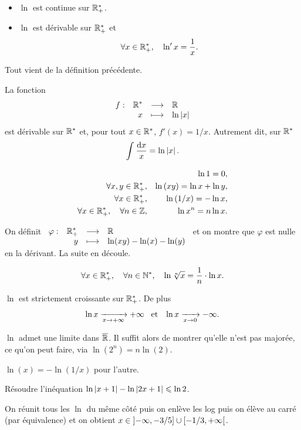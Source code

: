 \documentclass{magnoliaold}
\begin{document}
\begin{proposition}[utile=-3]
\begin{itemize}
\item $\ln$ est continue sur $\mathbb{R}_+^*$.
\item $\ln$ est dérivable sur $\mathbb{R}_+^*$ et
  \[\forall x\in\mathbb{R}_+^* ,\quad \ln' x=\frac{1}{x}.\]
\end{itemize}
\end{proposition}

\begin{preuve}
Tout vient de la définition précédente.
\end{preuve}

\begin{remarqueUnique}
\remarque La fonction
  \[\begin{array}[t]{lrcl} \displaystyle{f} : & \displaystyle{{\mathbb{R}^*}} & \longrightarrow & \displaystyle{\mathbb{R}} \\ & \displaystyle{x} & \longmapsto & \displaystyle{\ln\left|x\right|} \end{array}\]
  est dérivable sur ${\mathbb{R}^*}$ et, pour tout $x\in{\mathbb{R}^*}$, $f'(x)=1/x$. Autrement dit, sur ${\mathbb{R}^*}$
  \[\int_{}^{} \frac{\text{d}x}{x}=\ln\left|x\right|.\]
\end{remarqueUnique}

\begin{proposition}[utile=-3]
\begin{eqnarray*}
                   & & \ln 1=0,\\
\forall x,y\in\mathbb{R}_+^*, & & \ln\left(xy\right)=\ln x+\ln y,\\
\forall x\in\mathbb{R}_+^*, & & \ln\left(1/x\right)=-\ln x,\\
\forall x\in\mathbb{R}_+^* ,\quad \forall n\in\mathbb{Z}, & & \ln x^n=n\ln x.
\end{eqnarray*}
\end{proposition}

\begin{preuve}
On définit $\begin{array}[t]{lrcl} \displaystyle{\varphi} : & \displaystyle{\mathbb{R}_+^*} & \longrightarrow & \displaystyle{\mathbb{R}} \\ & \displaystyle{y} & \longmapsto & \displaystyle{\ln(xy)-\ln(x)-\ln(y)} \end{array}$ et on montre que $\varphi$ est nulle en la dérivant.
La suite en découle.
\end{preuve}

\begin{proposition}[utile=-3]
\[\forall x\in\mathbb{R}_+^* ,\quad \forall n\in{\mathbb{N}^*} ,\quad
  \ln\sqrt[n]{x}=\frac{1}{n}\cdot\ln x.\]
\end{proposition}

\begin{proposition}[utile=-3]
$\ln$ est strictement croissante sur $\mathbb{R}_+^*$. De plus
\[\ln x \xrightarrow[x\rightarrow +\infty]{} +\infty \quad\!\text{et}\quad\!
  \ln x \xrightarrow[x\rightarrow 0]{} -\infty.\]
\end{proposition}

\begin{preuve}
$\ln$ admet une limite dans $\overline{\mathbb{R}}$. Il suffit alors de montrer qu'elle n'est pas majorée, ce qu'on peut faire, via $\ln(2^n)=n\ln(2)$.

$\ln(x)=-\ln(1/x)$ pour l'autre.
\end{preuve}
\begin{exoUnique}
\exemple Résoudre l'inéquation $\ln\left|x+1\right|-\ln\left|2x+1\right|\leqslant\ln 2$.
  \begin{sol}
On réunit tous les $\ln$ du même côté puis on enlève les log puis on élève au carré (par équivalence) et on obtient $x\in\left]-\infty,-3/5\right]\cup\left[-1/3,+\infty\right[$. 
  \end{sol}
\end{exoUnique}
\end{document}
